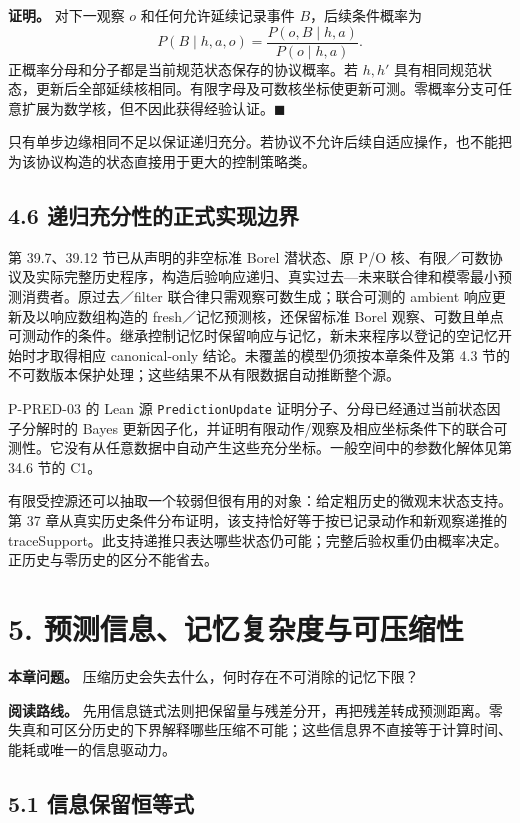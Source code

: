 \documentclass[
  11pt,
  oneside]{book}
\begin{document}
\textbf{证明。} 对下一观察 \(o\) 和任何允许延续记录事件 \(B\)，后续条件概率为 \[P(B\mid h,a,o)
=\frac{P(o,B\mid h,a)}{P(o\mid h,a)}.\] 正概率分母和分子都是当前规范状态保存的协议概率。若 \(h,h'\) 具有相同规范状态，更新后全部延续核相同。有限字母及可数核坐标使更新可测。零概率分支可任意扩展为数学核，但不因此获得经验认证。\(\blacksquare\)

只有单步边缘相同不足以保证递归充分。若协议不允许后续自适应操作，也不能把为该协议构造的状态直接用于更大的控制策略类。

\section{4.6 递归充分性的正式实现边界}\label{ux9012ux5f52ux5145ux5206ux6027ux7684ux6b63ux5f0fux5b9eux73b0ux8fb9ux754c}

第 39.7、39.12 节已从声明的非空标准 Borel 潜状态、原 P/O 核、有限／可数协议及实际完整历史程序，构造后验响应递归、真实过去---未来联合律和模零最小预测消费者。原过去／filter 联合律只需观察可数生成；联合可测的 ambient 响应更新及以响应数组构造的 fresh／记忆预测核，还保留标准 Borel 观察、可数且单点可测动作的条件。继承控制记忆时保留响应与记忆，新未来程序以登记的空记忆开始时才取得相应 canonical-only 结论。未覆盖的模型仍须按本章条件及第 4.3 节的不可数版本保护处理；这些结果不从有限数据自动推断整个源。

P-PRED-03 的 Lean 源 \nolinkurl{PredictionUpdate} 证明分子、分母已经通过当前状态因子分解时的 Bayes 更新因子化，并证明有限动作/观察及相应坐标条件下的联合可测性。它没有从任意数据中自动产生这些充分坐标。一般空间中的参数化解体见第 34.6 节的 C1。

有限受控源还可以抽取一个较弱但很有用的对象：给定粗历史的微观末状态支持。第 37 章从真实历史条件分布证明，该支持恰好等于按已记录动作和新观察递推的 traceSupport。此支持递推只表达哪些状态仍可能；完整后验权重仍由概率决定。正历史与零历史的区分不能省去。

\chapter{5. 预测信息、记忆复杂度与可压缩性}\label{ch-5}

\textbf{本章问题。} 压缩历史会失去什么，何时存在不可消除的记忆下限？

\textbf{阅读路线。} 先用信息链式法则把保留量与残差分开，再把残差转成预测距离。零失真和可区分历史的下界解释哪些压缩不可能；这些信息界不直接等于计算时间、能耗或唯一的信息驱动力。

\section{5.1 信息保留恒等式}\label{ux4fe1ux606fux4fddux7559ux6052ux7b49ux5f0f}
\end{document}
